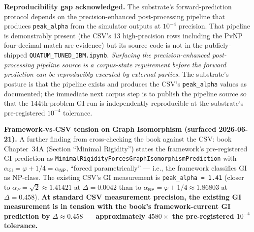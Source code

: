 \documentclass[11pt,a4paper]{amsart}
\theoremstyle{plain}
\theoremstyle{definition}
\begin{document}
\textbf{Reproducibility gap acknowledged.} The substrate's forward-prediction protocol depends on the precision-enhanced post-processing pipeline that produces \texttt{peak\_alpha} from the simulator outputs at $10^{-4}$ precision. That pipeline is demonstrably present (the CSV's 13 high-precision rows including the PvNP four-decimal match are evidence) but its source code is not in the publicly-shipped \texttt{QUATUM\_TUNED\_IBM.ipynb}. \emph{Surfacing the precision-enhanced post-processing pipeline source is a corpus-state requirement before the forward prediction can be reproducibly executed by external parties.} The substrate's posture is that the pipeline exists and produces the CSV's \texttt{peak\_alpha} values as documented; the immediate next corpus step is to publish the pipeline source so that the 144th-problem GI run is independently reproducible at the substrate's pre-registered $10^{-4}$ tolerance.

\textbf{Framework-vs-CSV tension on Graph Isomorphism (surfaced 2026-06-21).} A further finding from cross-checking the book against the CSV: book Chapter~34A (Section ``Minimal Rigidity'') states the framework's pre-registered GI prediction as \texttt{MinimalRigidityForcesGraphIsomorphismPrediction} with $\alpha_{\textsf{GI}} = \varphi + 1/4 = \alpha_{\textsf{NP}}$, ``forced parametrically'' --- i.e., the framework classifies GI as NP-class. The existing CSV's GI measurement is \texttt{peak\_alpha = 1.41} (closer to $\alpha_{P} = \sqrt{2} \approx 1.41421$ at $\Delta = 0.0042$ than to $\alpha_{\textsf{NP}} = \varphi + 1/4 \approx 1.86803$ at $\Delta = 0.458$). \textbf{At standard CSV measurement precision, the existing GI measurement is in tension with the book's framework-current GI prediction by} $\Delta \approx 0.458$ \textbf{--- approximately $4580\times$ the pre-registered $10^{-4}$ tolerance.}
\end{document}
